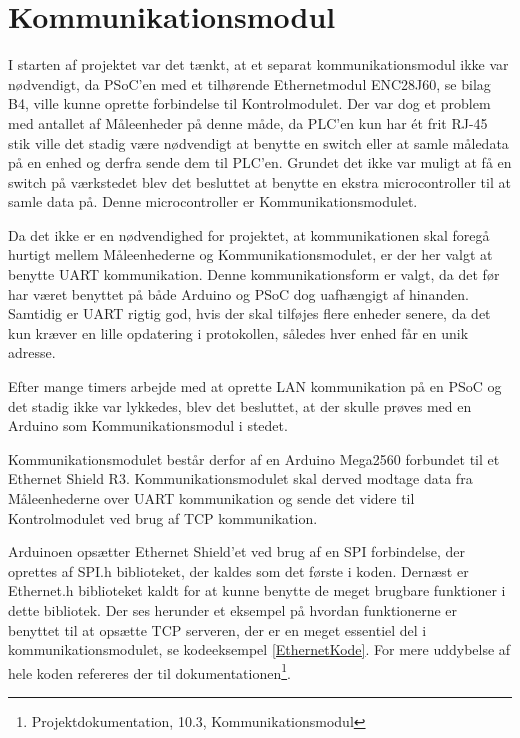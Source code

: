 
\section{Kommunikationsmodul}
\label{Kommunikationsmodul}

I starten af projektet var det tænkt, at et separat kommunikationsmodul ikke var nødvendigt, da PSoC'en med et tilhørende Ethernetmodul ENC28J60, se bilag B4, ville kunne oprette forbindelse til Kontrolmodulet. Der var dog et problem med antallet af Måleenheder på denne måde, da PLC'en kun har ét frit RJ-45 stik ville det stadig være nødvendigt at benytte en switch eller at samle måledata på en enhed og derfra sende dem til PLC'en. Grundet det ikke var muligt at få en switch på værkstedet blev det besluttet at benytte en ekstra microcontroller til at samle data på. Denne microcontroller er Kommunikationsmodulet.   

Da det ikke er en nødvendighed for projektet, at kommunikationen skal foregå hurtigt mellem Måleenhederne og Kommunikationsmodulet, er der her valgt at benytte UART kommunikation. Denne kommunikationsform er valgt, da det før har været benyttet på både Arduino og PSoC dog uafhængigt af hinanden. Samtidig er UART rigtig god, hvis der skal tilføjes flere enheder senere, da det kun kræver en lille opdatering i protokollen, således hver enhed får en unik adresse.  

Efter mange timers arbejde med at oprette LAN kommunikation på en PSoC og det stadig ikke var lykkedes, blev det besluttet, at der skulle prøves med en Arduino som Kommunikationsmodul i stedet. 

Kommunikationsmodulet består derfor af en Arduino Mega2560 forbundet til et Ethernet Shield R3. Kommunikationsmodulet skal derved modtage data fra Måleenhederne over UART kommunikation og sende det videre til Kontrolmodulet ved brug af TCP kommunikation. 

Arduinoen opsætter Ethernet Shield'et ved brug af en SPI forbindelse, der oprettes af SPI.h biblioteket, der kaldes som det første i koden. Dernæst er Ethernet.h biblioteket kaldt for at kunne benytte de meget brugbare funktioner i dette bibliotek\cite{Ethernet}. Der ses herunder et eksempel på hvordan funktionerne er benyttet til at opsætte TCP serveren, der er en meget essentiel del i kommunikationsmodulet, se kodeeksempel \ref{EthernetKode}. For mere uddybelse af hele koden refereres der til dokumentationen\footnote{Projektdokumentation, 10.3, Kommunikationsmodul}.

